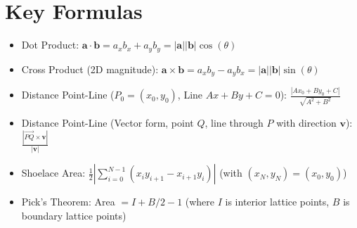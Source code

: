\section{Key Formulas}
\label{sec:AppA.1}

\begin{itemize}
    \item Dot Product: $\mathbf{a} \cdot \mathbf{b} = a_x b_x + a_y b_y = |\mathbf{a}||\mathbf{b}|\cos(\theta)$
    \item Cross Product (2D magnitude): $\mathbf{a} \times \mathbf{b} = a_x b_y - a_y b_x = |\mathbf{a}||\mathbf{b}|\sin(\theta)$
    \item Distance Point-Line ($P_0=(x_0, y_0)$, Line $Ax+By+C=0$): $\frac{|Ax_0 + By_0 + C|}{\sqrt{A^2+B^2}}$
    \item Distance Point-Line (Vector form, point $Q$, line through $P$ with direction $\mathbf{v}$): $\frac{|\vec{PQ} \times \mathbf{v}|}{|\mathbf{v}|}$
    \item Shoelace Area: $\frac{1}{2} \left| \sum_{i=0}^{N-1} (x_i y_{i+1} - x_{i+1} y_i) \right|$ (with $(x_N, y_N) = (x_0, y_0)$)
    \item Pick's Theorem: Area $= I + B/2 - 1$ (where $I$ is interior lattice points, $B$ is boundary lattice points)
\end{itemize}
